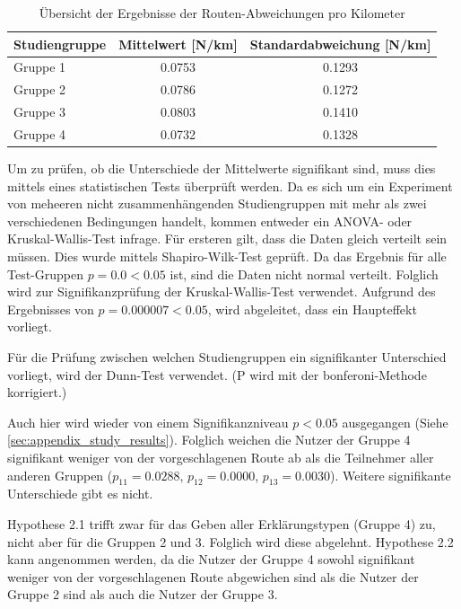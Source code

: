 \begin{table}
    \begin{center}
        \begin{tabular}{|l|c|c|}
            \hline
            \textbf{Studiengruppe}  & \textbf{Mittelwert} [N/km] & \textbf{Standardabweichung} [N/km]\\ \hline
            Gruppe 1                & 0.0753 & 0.1293 \\ \hline
            Gruppe 2                & 0.0786 & 0.1272 \\ \hline
            Gruppe 3                & 0.0803 & 0.1410 \\ \hline
            Gruppe 4                & 0.0732 &  0.1328 \\ \hline
        \end{tabular}
    \end{center}
    \caption{Übersicht der Ergebnisse der Routen-Abweichungen pro Kilometer}
    \label{tab:study_offroute_results}
\end{table}

Um zu prüfen, ob die Unterschiede der Mittelwerte signifikant sind, muss dies mittels eines statistischen Tests überprüft werden. Da es sich um ein Experiment von meheeren nicht zusammenhängenden Studiengruppen mit mehr als zwei verschiedenen Bedingungen handelt, kommen entweder ein ANOVA- oder Kruskal-Wallis-Test infrage. Für ersteren gilt, dass die Daten gleich verteilt sein müssen. Dies wurde mittels Shapiro-Wilk-Test geprüft. Da das Ergebnis für alle Test-Gruppen $ p = 0.0 < 0.05 $ ist, sind die Daten nicht normal verteilt. Folglich wird zur Signifikanzprüfung der Kruskal-Wallis-Test verwendet. Aufgrund des Ergebnisses von $ p = 0.000007 < 0.05 $, wird abgeleitet, dass ein Haupteffekt vorliegt.

Für die Prüfung zwischen welchen Studiengruppen ein signifikanter Unterschied vorliegt, wird der Dunn-Test \cite{dunn1964multiple} verwendet. (P wird mit der \glqq bonferoni\grqq{}-Methode korrigiert.)

Auch hier wird wieder von einem Signifikanzniveau $ p < 0.05 $ ausgegangen (Siehe \autoref{sec:appendix_study_results}). Folglich weichen die Nutzer der Gruppe 4 signifikant weniger von der vorgeschlagenen Route ab als die Teilnehmer aller anderen Gruppen ($ p_{11} = 0.0288 $, $ p_{12} = 0.0000 $, $ p_{13} = 0.0030 $). Weitere signifikante Unterschiede gibt es nicht.

Hypothese 2.1 trifft zwar für das Geben aller Erklärungstypen (Gruppe 4) zu, nicht aber für die Gruppen 2 und 3. Folglich wird diese abgelehnt. Hypothese 2.2 kann angenommen werden, da die Nutzer der Gruppe 4 sowohl signifikant weniger von der vorgeschlagenen Route abgewichen sind als die Nutzer der Gruppe 2 sind als auch die Nutzer der Gruppe 3.

